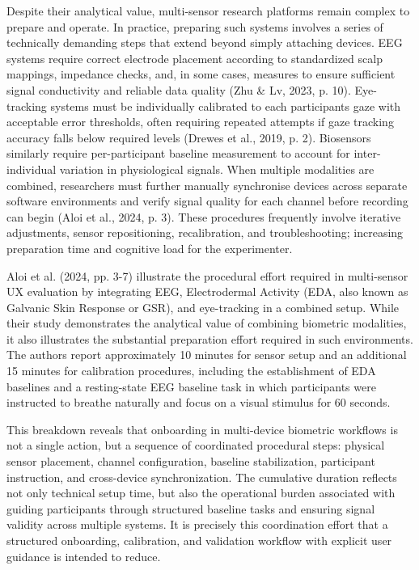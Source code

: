 \documentclass[
]{article}
\begin{document}
Despite their analytical value, multi-sensor research platforms remain complex to prepare and operate. In practice, preparing such systems involves a series of technically demanding steps that extend beyond simply attaching devices. EEG systems require correct electrode placement according to standardized scalp mappings, impedance checks, and, in some cases, measures to ensure sufficient signal conductivity and reliable data quality (Zhu \& Lv, 2023, p. 10). Eye-tracking systems must be individually calibrated to each participant\textquotesingle s gaze with acceptable error thresholds, often requiring repeated attempts if gaze tracking accuracy falls below required levels (Drewes et al., 2019, p. 2). Biosensors similarly require per-participant baseline measurement to account for inter-individual variation in physiological signals. When multiple modalities are combined, researchers must further manually synchronise devices across separate software environments and verify signal quality for each channel before recording can begin (Aloi et al., 2024, p. 3). These procedures frequently involve iterative adjustments, sensor repositioning, recalibration, and troubleshooting; increasing preparation time and cognitive load for the experimenter.

Aloi et al. (2024, pp. 3-7) illustrate the procedural effort required in multi-sensor UX evaluation by integrating EEG, Electrodermal Activity (EDA, also known as Galvanic Skin Response or GSR), and eye-tracking in a combined setup. While their study demonstrates the analytical value of combining biometric modalities, it also illustrates the substantial preparation effort required in such environments. The authors report approximately 10 minutes for sensor setup and an additional 15 minutes for calibration procedures, including the establishment of EDA baselines and a resting-state EEG baseline task in which participants were instructed to breathe naturally and focus on a visual stimulus for 60 seconds.

This breakdown reveals that onboarding in multi-device biometric workflows is not a single action, but a sequence of coordinated procedural steps: physical sensor placement, channel configuration, baseline stabilization, participant instruction, and cross-device synchronization. The cumulative duration reflects not only technical setup time, but also the operational burden associated with guiding participants through structured baseline tasks and ensuring signal validity across multiple systems. It is precisely this coordination effort that a structured onboarding, calibration, and validation workflow with explicit user guidance is intended to reduce.
\end{document}
